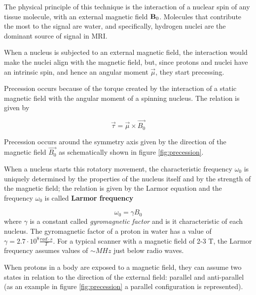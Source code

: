 \documentclass[11pt]{report}
\begin{document}
The physical principle of this technique is the interaction of a nuclear spin of any tissue molecule, with an external magnetic field $\textbf B_0$.
Molecules that contribute the most to the signal are water, and specifically, hydrogen nuclei are the dominant source of signal in MRI.

When a nucleus is subjected to an external magnetic field, the interaction would make the nuclei align with the magnetic field, but, since protons and nuclei have an intrinsic spin, and hence an angular moment $\overrightarrow{\mu}$, they start precessing.

Precession occurs because of the torque created by the interaction of a static magnetic field with the angular moment of a spinning nucleus.
The relation is given by

\begin{equation}
\overrightarrow{\tau} = \overrightarrow{\mu} \times \overrightarrow{B_0}
\end{equation}

Precession occurs around the symmetry axis given by the direction of the magnetic field $\overrightarrow{B_0}$ as schematically shown in figure \ref{fig:precession}.

When a nucleus starts this rotatory movement, the characteristic frequency $\omega_0$ is uniquely determined by the properties of the nucleus itself and by the strength of the magnetic field; the relation is given by the Larmor equation and the frequency $\omega_0$ is called \textbf{Larmor frequency}

\[
\omega_0 = \gamma B_0
\]
where  $\gamma$ is a constant called \emph{gyromagnetic factor} and is it characteristic of each nucleus.
The gyromagnetic factor of a proton in water has a value of $\gamma = 2.7\cdot 10^8 \frac{rad\cdot s}{T}$.
For a typical scanner with a magnetic field of 2-3 T, the Larmor frequency assumes values of $\sim MHz$ just below radio waves.

When protons in a body are exposed to a magnetic field, they can assume two states in relation to the direction of the external field: parallel and anti-parallel (as an example in figure \ref{fig:precession} a parallel configuration is represented).
\end{document}
